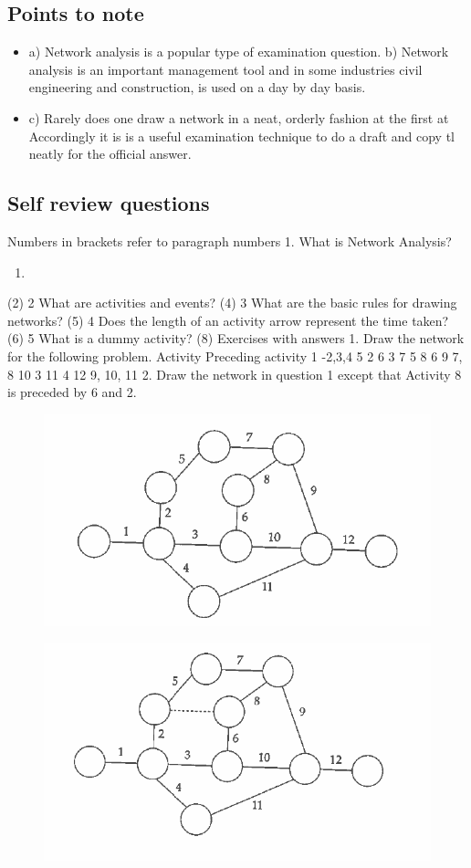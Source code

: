\documentclass[]{report}
\begin{document}
\subsection*{Points to note}
\begin{itemize}
	\item a) Network analysis is a popular type of examination question. b) Network analysis is an important management tool and in some industries civil engineering and construction, is used on a day by day basis. 
	\item c) Rarely does one draw a network in a neat, orderly fashion at the first at Accordingly it is is a useful examination technique to do a draft and copy tl neatly for the official answer. 
\end{itemize}
\subsection*{Self review questions} Numbers in brackets refer to paragraph numbers 1. What is Network Analysis?
\begin{enumerate}
	\item 
\end{enumerate} (2) 2 What are activities and events? (4) 3 What are the basic rules for drawing networks? (5) 4 Does the length of an activity arrow represent the time taken? (6) 5 What is a dummy activity? (8) 
Exercises with answers 1. Draw the network for the following problem. Activity Preceding activity 
1 -2,3,4 5 2 6 3 7 5 8 6 9 7, 8 10 3 11 4 12 9, 10, 11 2. Draw the network in question 1 except that Activity 8 is preceded by 6 and 2. 

\newpage
\begin{figure}[h!]
\centering
\includegraphics[width=0.4\linewidth]{329-A}
\caption{}
\label{fig:329-a}
\end{figure}
\begin{figure}[h!]
\centering
\includegraphics[width=0.4\linewidth]{329-b}
\caption{}
\label{fig:329-b}
\end{figure}
\end{document}
